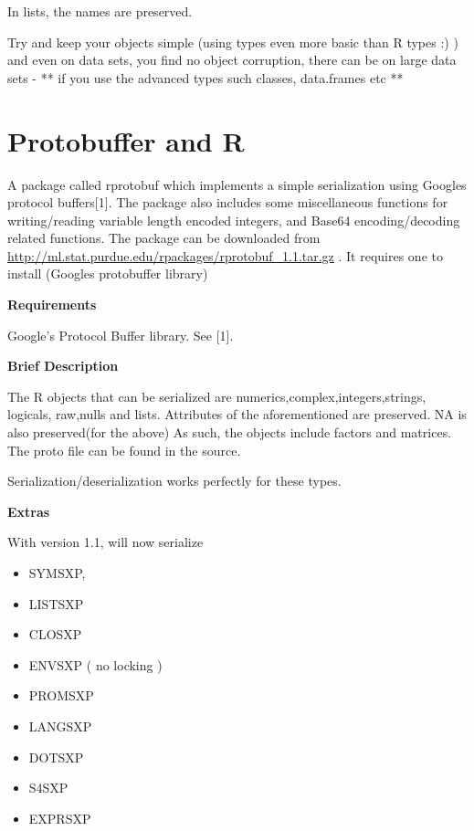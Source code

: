 \documentclass[letterpaper,10pt,english]{manual}
\begin{document}
In lists, the names are preserved.

Try and keep your objects simple (using types even more basic than R types :) ) and even on data sets, you find no object corruption, there can be on large data sets  - ** if you use the advanced types such classes, data.frames etc **

\resetcurrentobjects
\hypertarget{--doc-ProtoBuffers}{}

\chapter{Protobuffer and R}

A package called rprotobuf which implements a simple serialization using Googles
protocol buffers{[}1{]}.  The package also includes some miscellaneous functions for
writing/reading variable length encoded integers, and Base64 encoding/decoding
related functions.  The package can be downloaded from
\href{http://ml.stat.purdue.edu/rpackages/rprotobuf\_1.1.tar.gz}{http://ml.stat.purdue.edu/rpackages/rprotobuf\_1.1.tar.gz} . It requires one to install 
(Googles protobuffer library)

\textbf{Requirements}

Google's Protocol Buffer library. See {[}1{]}.

\textbf{Brief Description}

The R objects that can be serialized are numerics,complex,integers,strings, logicals,
raw,nulls and lists.  Attributes of the aforementioned are preserved. NA is also
preserved(for the above) As such, the objects include factors and matrices.  The proto file can be
found in the source.

Serialization/deserialization works perfectly for these types.

\textbf{Extras}

With version 1.1,  will now serialize
\begin{itemize}
\item {} 
SYMSXP,

\item {} 
LISTSXP

\item {} 
CLOSXP

\item {} 
ENVSXP ( no locking )

\item {} 
PROMSXP

\item {} 
LANGSXP

\item {} 
DOTSXP

\item {} 
S4SXP

\item {} 
EXPRSXP

\end{itemize}
\end{document}
